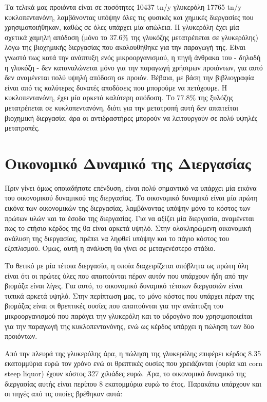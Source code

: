 \documentclass[11pt]{article}
\begin{document}
Τα τελικά μας προιόντα είναι σε ποσότητες 10437 tn/y γλυκερόλη 17765 tn/y κυκλοπεντανόνη, λαμβάνοντας υπόψην όλες τις φυσικές και χημικές διεργασίες που χρησιμοποιήθηκαν, καθώς σε όλες υπάρχει μία απώλεια. Η γλυκερόλη έχει μία σχετικά χαμηλή απόδοση (μόνο το \(37.6 \%\) της γλυκόζης μετατρέπεται σε γλυκερόλης) λόγω της βιοχημικής διεργασίας που ακολουθήθηκε για την παραγωγή της. Είναι γνωστό πως κατά την ανάπτυξη ενός μικροοργανισμού, η πηγή άνθρακα του - δηλαδή η γλυκόζη - δεν καταναλώνεται μόνο για την παραγωγή χρήσιμων προιόντων, για αυτό δεν αναμένεται πολύ υψηλή απόδοση σε προιόν. Βέβαια, με βάση την βιβλιογραφία είναι από τις καλύτερες δυνατές αποδόσεις που μπορούμε να πετύχουμε. Η κυκλοπεντανόνη, έχει μία αρκετά καλύτερη απόδοση. Το \(77.8 \%\) της ξυλόζης μετατρέπεται σε κυκλοπεντανόνη, διότι για την μετατροπή αυτή δεν απαιτείται βιοχημική διεργασία, άρα οι αντιδραστήρες μπορούν να λειτουργούν σε πολύ υψηλές μετατροπές.

\section{Οικονομικό Δυναμικό της Διεργασίας}
\label{sec:orge6e1fb1}
Πριν γίνει όμως οποιαδήποτε επένδυση, είναι πολύ σημαντικό να υπάρχει μία εικόνα του οικονομικού δυναμικού της διεργασίας. Το οικονομικό δυναμικό είναι μία πρώτη εικόνα των οικονομικών της διεργασίας, λαμβάνοντας υπόψην μόνο το κόστος των πρώτων υλών και τα έσοδα της διεργασίας. Για να αξίζει μία διεργασία, αναμένεται πως το ετήσιο κέρδος της θα είναι αρκετά υψηλό. Στην ολοκληρώμενη οικονομική ανάλυση της διεργασίας, πρέπει να ληφθεί υπόψην και το πάγιο κόστος του εξοπλισμού. Όμως, αυτή η ανάλυση θα γίνει σε μεταγενέστερο στάδιο.

Το θετικό με μία τέτοια διεργασία, η οποία διαχειρίζεται απόβλητα ως πρώτη ύλη είναι ότι οι πρώτες ύλες που απαιτούνται πέραν αυτόν που υπάρχουν ήδη από την βιομάζα είναι λίγες. Για αυτό, το οικονομικό δυναμικό τέτοιων διεργασιών είναι τυπικά αρκετά υψηλό. Στην περίπτωση μας, το μόνο κόστος που υπάρχει πέραν της βιομάζας είναι οι θρεπτικές ουσίες που απαιτούνται για την ανάπτυξη του μικροοργανισμού που παράγει την γλυκερόλη και το υδρογόνο που χρησιμοποιείται για την παραγωγή της κυκλοπεντανόνης, ενώ ως κέρδος υπάρχει η πώληση των δύο προιόντων.

Από την πλευρά της γλυκερόλης άρα, η πώληση της γλυκερόλης επιφέρει κέρδος 8.35 εκατομμύρια ευρώ τον χρόνο ενώ οι θρεπτικές ουσίες που χρειάζονται (ουρία και corn steep liquor) έχουν κόστος 327 χιλιάδες ευρώ. Άρα, το οικονομικό δυναμικό της διεργασίας αυτής είναι περίπου 8 εκατομμύρια ευρώ το έτος. Παρακάτω υπάρχουν και οι πηγές από τις οποίες βρέθηκαν αυτά:
\end{document}
